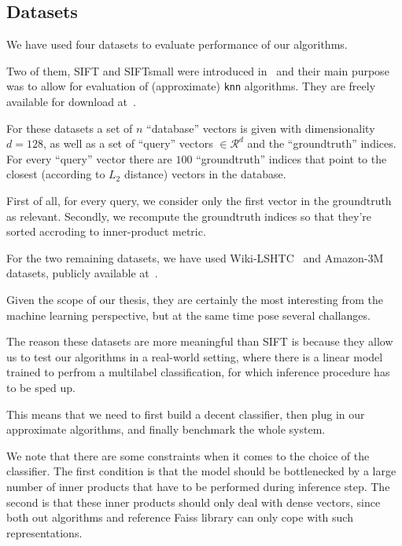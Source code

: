     \subsection{Datasets}\label{subsec:datasets}

        We have used four datasets to evaluate performance of our algorithms.

        Two of them, SIFT and SIFTsmall were introduced in~\cite{jegou2011product} and their
        main purpose was to allow for evaluation of (approximate) \texttt{knn} algorithms. They are freely
        available for download at~\cite{sift}.

        For these datasets a set of $n$ ``database'' vectors is given with dimensionality
        $d=128$, as well as a set of ``query'' vectors $\in \mathcal{R}^d$
        and the ``groundtruth'' indices. For every ``query'' vector there are $100$ ``groundtruth'' indices
        that point to the closest (according to $L_2$ distance) vectors in the database.

        First of all, for every query, we consider only the first vector in the groundtruth as relevant.
        Secondly, we recompute the groundtruth indices so that they're sorted accroding to inner-product
        metric.

        For the two remaining datasets, we have used Wiki-LSHTC~\cite{lshtc} and
        Amazon-3M~\cite{a3m} datasets, publicly available at~\cite{exrepo}.

        Given the scope of our thesis, they are certainly the most interesting from the machine learning perspective,
        but at the same time pose several challanges.

        The reason these datasets are more meaningful than SIFT is because they allow us to test our
        algorithms in a real-world setting, where there is a linear model trained to perfrom a multilabel
        classification, for which inference procedure has to be sped up.

        This means that we need to first build a decent classifier, then plug in our approximate algorithms,
        and finally benchmark the whole system.

        We note that there are some constraints when it comes to the choice of the classifier. The first condition
        is that the model should be bottlenecked by a large number of inner products that have to be performed during
        inference step. The second is that these inner products should only deal with dense vectors, since both
        out algorithms and reference Faiss library can only cope with such representations.

